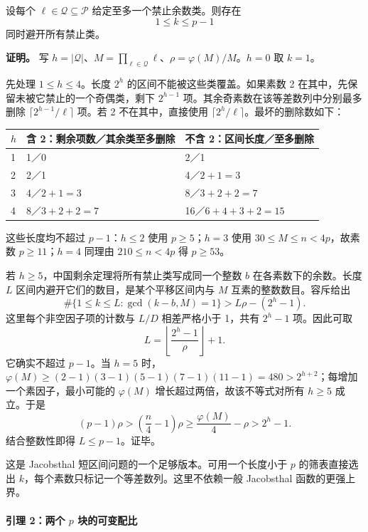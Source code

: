 \documentclass[11pt,a4paper]{article}
\theoremstyle{definition}
\numberwithin{equation}{section}
\begin{document}
{设每个} \(\ell\in\mathcal Q\subseteq\mathcal P\) {给定至多一个禁止余数类。则存在} \[
1\le k\le p-1
\tag{C8.2}
\] {同时避开所有禁止类。}

\textbf{{证明。}} {写} \(h=|\mathcal Q|\){、}\(M=\prod_{\ell\in\mathcal Q}\ell\){、}\(\rho=\varphi(M)/M\){。}\(h=0\) {取} \(k=1\){。}

{先处理} \(1\le h\le4\){。长度} \(2^h\) {的区间不能被这些类覆盖。如果素数} {2} {在其中，先保留未被它禁止的一个奇偶类，剩下} \(2^{h-1}\) {项。其余奇素数在该等差数列中分别最多删除} \(\lceil 2^{h-1}/\ell\rceil\) {项。若} {2} {不在其中，直接使用} \(\lceil2^h/\ell\rceil\){。最坏的删除数如下：}

{ %
\begin{longtable}[]{@{}lll@{}}
\toprule\noalign{}
\(h\) & {含} {2：剩余项数／其余类至多删除} & {不含} {2：区间长度／至多删除} \\
\midrule\noalign{}
\endhead
\bottomrule\noalign{}
\endlastfoot
{1} & {1／0} & {2／1} \\
{2} & {2／1} & {4／}\(2+1=3\) \\
{3} & {4／}\(2+1=3\) & {8／}\(3+2+2=7\) \\
{4} & {8／}\(3+2+2=7\) & {16／}\(6+4+3+2=15\) \\
\end{longtable}
}

{这些长度均不超过} \(p-1\){：}\(h\le2\) {使用} \(p\ge5\){；}\(h=3\) {使用} \(30\le M\le n<4p\){，故素数} \(p\ge11\){；}\(h=4\) {同理由} \(210\le n<4p\) {得} \(p\ge53\){。}

{若} \(h\ge5\){，中国剩余定理将所有禁止类写成同一个整数} \(b\) {在各素数下的余数。长度} \(L\) {区间内避开它们的数目，是某个平移区间内与} \(M\) {互素的整数数目。容斥给出} \[
\#\{1\le k\le L:\gcd(k-b,M)=1\}
>L\rho-(2^h-1).
\tag{C8.3}
\] {这里每个非空因子项的计数与} \(L/D\) {相差严格小于} {1，共有} \(2^h-1\) {项。因此可取} \[
L=\left\lfloor\frac{2^h-1}{\rho}\right\rfloor+1.
\tag{C8.4}
\] {它确实不超过} \(p-1\){。当} \(h=5\) {时，}\(\varphi(M)\ge(2-1)(3-1)(5-1)(7-1)(11-1)=480>2^{h+2}\){；每增加一个素因子，最小可能的} \(\varphi(M)\) {增长超过两倍，故该不等式对所有} \(h\ge5\) {成立。于是} \[
(p-1)\rho>
\left(\frac n4-1\right)\rho
\ge\frac{\varphi(M)}4-\rho
>2^h-1.
\] {结合整数性即得} \(L\le p-1\){。证毕。}

{这是} {Jacobsthal} {短区间问题的一个足够版本。可用一个长度小于} \(p\) {的筛表直接选出} \(k\){，每个素数只标记一个等差数列。这里不依赖一般} {Jacobsthal} {函数的更强上界。}

\paragraph*{\texorpdfstring{{引理} {2：两个} {\ensuremath{p}} {块的可变配比}}{引理 2：两个  块的可变配比}}\label{C8-h48}
\end{document}
